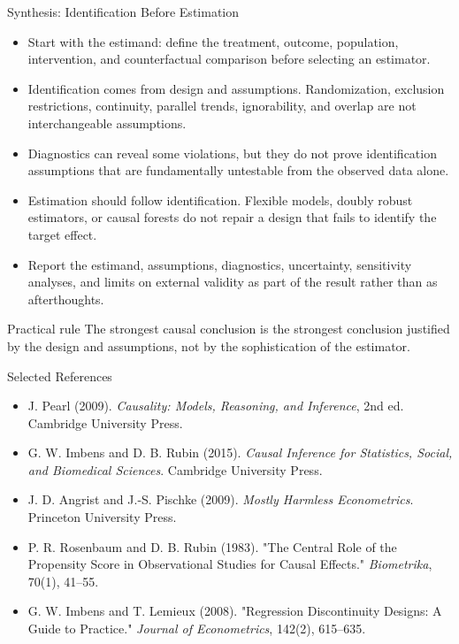 \documentclass[aspectratio=169,11pt]{beamer}
\begin{document}
\begin{frame}{Synthesis: Identification Before Estimation}
  \begin{itemize}
    \item Start with the estimand: define the treatment, outcome, population, intervention, and counterfactual comparison before selecting an estimator.
    \item Identification comes from design and assumptions. Randomization, exclusion restrictions, continuity, parallel trends, ignorability, and overlap are not interchangeable assumptions.
    \item Diagnostics can reveal some violations, but they do not prove identification assumptions that are fundamentally untestable from the observed data alone.
    \item Estimation should follow identification. Flexible models, doubly robust estimators, or causal forests do not repair a design that fails to identify the target effect.
    \item Report the estimand, assumptions, diagnostics, uncertainty, sensitivity analyses, and limits on external validity as part of the result rather than as afterthoughts.
  \end{itemize}

  \begin{alertbox}{Practical rule}
    The strongest causal conclusion is the strongest conclusion justified by the design and assumptions, not by the sophistication of the estimator.
  \end{alertbox}
\end{frame}

\begin{frame}{Selected References}
  \small
  \begin{itemize}
    \item J. Pearl (2009). \textit{Causality: Models, Reasoning, and Inference}, 2nd ed. Cambridge University Press.
    \item G. W. Imbens and D. B. Rubin (2015). \textit{Causal Inference for Statistics, Social, and Biomedical Sciences}. Cambridge University Press.
    \item J. D. Angrist and J.-S. Pischke (2009). \textit{Mostly Harmless Econometrics}. Princeton University Press.
    \item P. R. Rosenbaum and D. B. Rubin (1983). "The Central Role of the Propensity Score in Observational Studies for Causal Effects." \textit{Biometrika}, 70(1), 41--55.
    \item G. W. Imbens and T. Lemieux (2008). "Regression Discontinuity Designs: A Guide to Practice." \textit{Journal of Econometrics}, 142(2), 615--635.
  \end{itemize}
\end{frame}

\contactslide
\end{document}
